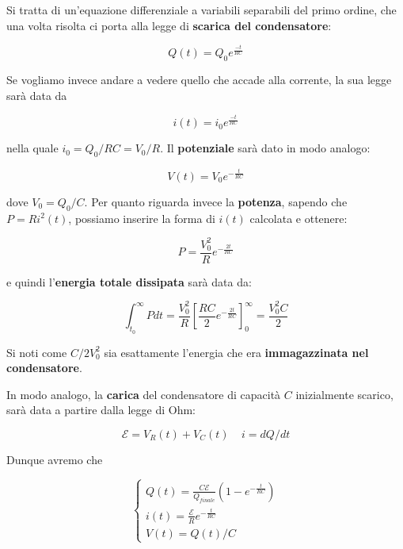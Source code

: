 Si tratta di un'equazione differenziale a variabili separabili del primo ordine, che una volta risolta ci porta alla legge di \textbf{scarica del condensatore}: 

\begin{large}
	\begin{equation} \label{eq_scarica_condensatore}
		Q(t) = Q_0 e^{\frac{-t}{RC}}
	\end{equation}
\end{large}

Se vogliamo invece andare a vedere quello che accade alla corrente, la sua legge sarà data da
\begin{large}
	\begin{equation}
		i(t) = i_0 e^{\frac{-t}{RC}}
	\end{equation}
\end{large}

nella quale $i_0 = Q_0/RC = V_0/R$. Il \textbf{potenziale} sarà dato in modo analogo: 

\begin{large}
	\begin{equation}
		V(t) = V_0 e^{-\frac{t}{RC}}
	\end{equation}
\end{large}

dove $V_0 = Q_0/C$. Per quanto riguarda invece la \textbf{potenza}, sapendo che $P = Ri^2(t)$, possiamo inserire la forma di $i(t)$ calcolata e ottenere: 

$$ P = \frac{V_0^2}{R} e^{-\frac{2t}{RC}}$$

e quindi l'\textbf{energia totale dissipata} sarà data da: 

$$
\int_{t_0}^{\infty} Pdt = \frac{V_0^2}{R}\left[\frac{RC}{2}e^{-\frac{2t}{RC}}\right]_0^\infty = \frac{V_0^2C}{2}
$$

Si noti come $C/2 V_0^2$ sia esattamente l'energia che era \textbf{immagazzinata nel condensatore}. 

In modo analogo, la \textbf{carica} del condensatore di capacità $C$ inizialmente scarico, sarà data a partire dalla legge di Ohm: 

$$ \mathcal{E} = V_R(t) + V_C(t)  \;\;\;\;  i = dQ/dt$$

Dunque avremo che 

\begin{large}
	\begin{equation}
		\begin{cases}
		Q(t) = \frac{C\mathcal{E}}{Q_{finale}} \left(1 - e^{-\frac{t}{RC}}\right)\\
		i(t) = 	\frac{\mathcal{E}}{R}e^{-\frac{t}{RC}} \\
		V(t) = Q(t)/C
		\end{cases}
	\end{equation}
\end{large}

